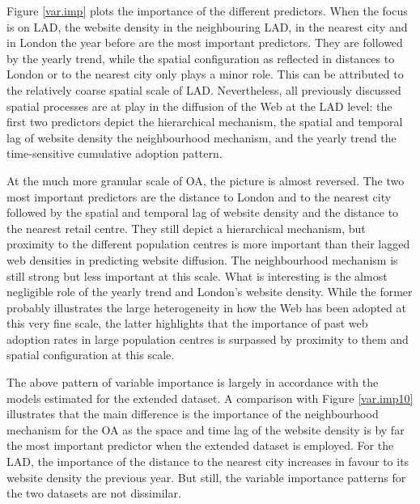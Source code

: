 \documentclass[
  authoryear,
  preprint,
  3p]{elsarticle}
\begin{document}
Figure \ref{var.imp} plots the importance of the different predictors.
When the focus is on LAD, the website density in the neighbouring LAD,
in the nearest city and in London the year before are the most important
predictors. They are followed by the yearly trend, while the spatial
configuration as reflected in distances to London or to the nearest city
only plays a minor role. This can be attributed to the relatively coarse
spatial scale of LAD. Nevertheless, all previously discussed spatial
processes are at play in the diffusion of the Web at the LAD level: the
first two predictors depict the hierarchical mechanism, the spatial and
temporal lag of website density the neighbourhood mechanism, and the
yearly trend the time-sensitive cumulative adoption pattern.

At the much more granular scale of OA, the picture is almost reversed.
The two most important predictors are the distance to London and to the
nearest city followed by the spatial and temporal lag of website density
and the distance to the nearest retail centre. They still depict a
hierarchical mechanism, but proximity to the different population
centres is more important than their lagged web densities in predicting
website diffusion. The neighbourhood mechanism is still strong but less
important at this scale. What is interesting is the almost negligible
role of the yearly trend and London's website density. While the former
probably illustrates the large heterogeneity in how the Web has been
adopted at this very fine scale, the latter highlights that the
importance of past web adoption rates in large population centres is
surpassed by proximity to them and spatial configuration at this scale.

The above pattern of variable importance is largely in accordance with
the models estimated for the extended dataset. A comparison with Figure
\ref{var.imp10} illustrates that the main difference is the importance
of the neighbourhood mechanism for the OA as the space and time lag of
the website density is by far the most important predictor when the
extended dataset is employed. For the LAD, the importance of the
distance to the nearest city increases in favour to its website density
the previous year. But still, the variable importance patterns for the
two datasets are not dissimilar.
\end{document}
